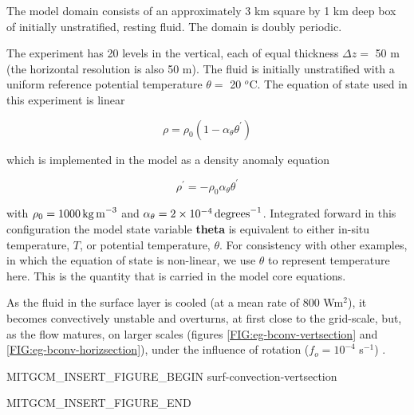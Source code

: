 The model domain consists of an approximately 3
km square by 1 km deep box of initially
unstratified, resting fluid. The domain is doubly periodic. 

The experiment has 20 levels in the vertical, each of equal thickness $\Delta z =$ 50
m (the horizontal resolution is also 50 m). The fluid is initially unstratified with a
uniform reference potential temperature $\theta = $ 20 $^o$C. The equation of state
used in this experiment is linear

\begin{equation}
\label{EQ:eg-bconv-linear1_eos}
\rho = \rho_{0} ( 1 - \alpha_{\theta}\theta^{'} )
\end{equation}

\noindent which is implemented in the model as a density anomaly equation

\begin{equation}
\label{EQ:eg-bconv-linear1_eos_pert}
\rho^{'} = -\rho_{0}\alpha_{\theta}\theta^{'}
\end{equation}

\noindent with $\rho_{0}=1000\,{\rm kg\,m}^{-3}$ and 
$\alpha_{\theta}=2\times10^{-4}\,{\rm degrees}^{-1} $. Integrated forward in
this configuration the model state variable {\bf theta} is equivalent to
either in-situ temperature, $T$, or potential temperature, $\theta$. For 
consistency with other examples, in which the equation of state is
non-linear, we use $\theta$ to represent temperature here. This is
the quantity that is carried in the model core equations.

As the fluid in the surface layer is cooled (at a mean rate of 800 Wm$^2$), it becomes 
convectively unstable and 
overturns, at first close to the grid-scale, but, as the flow matures, on larger scales 
(figures \ref{FIG:eg-bconv-vertsection} and \ref{FIG:eg-bconv-horizsection}), under the influence of 
rotation ($f_o = 10^{-4}$ s$^{-1}$) .

\begin{rawhtml}MITGCM_INSERT_FIGURE_BEGIN surf-convection-vertsection\end{rawhtml}
\begin{figure}
\begin{center}
\end{center}
\caption{
}
\label{FIG:eg-bconv-vertsection}
\label{fig:surf-convection-vertsection}
\end{figure}
\begin{rawhtml}MITGCM_INSERT_FIGURE_END\end{rawhtml}


